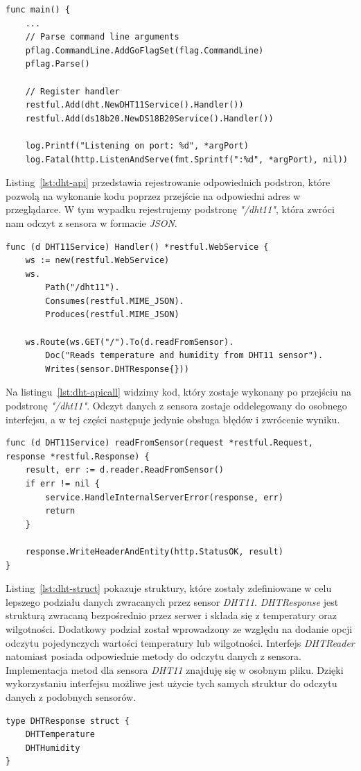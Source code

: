 \documentclass[12pt]{report}
\begin{document}
{\begin{lstlisting}[language=golang,caption=Konfiguracja aplikacji,label=lst:dht-config]
func main() {
	...
	// Parse command line arguments
	pflag.CommandLine.AddGoFlagSet(flag.CommandLine)
	pflag.Parse()

	// Register handler
	restful.Add(dht.NewDHT11Service().Handler())
	restful.Add(ds18b20.NewDS18B20Service().Handler())

	log.Printf("Listening on port: %d", *argPort)
	log.Fatal(http.ListenAndServe(fmt.Sprintf(":%d", *argPort), nil))
\end{lstlisting}

\noindent Listing~\ref{lst:dht-api} przedstawia rejestrowanie odpowiednich podstron, które pozwolą na wykonanie kodu poprzez przejście na odpowiedni adres w przeglądarce. W tym wypadku rejestrujemy podstronę \textit{"/dht11"}, która zwróci nam odczyt z sensora w formacie \textit{JSON}.
\begin{lstlisting}[language=golang,caption=Konfiguracja API,label=lst:dht-api]
func (d DHT11Service) Handler() *restful.WebService {
	ws := new(restful.WebService)
	ws.
		Path("/dht11").
		Consumes(restful.MIME_JSON).
		Produces(restful.MIME_JSON)

	ws.Route(ws.GET("/").To(d.readFromSensor).
		Doc("Reads temperature and humidity from DHT11 sensor").
		Writes(sensor.DHTResponse{}))
\end{lstlisting}

\noindent Na listingu~\ref{lst:dht-apicall} widzimy kod, który zostaje wykonany po przejściu na podstronę \textit{"/dht11"}. Odczyt danych z sensora zostaje oddelegowany do osobnego interfejsu, a w tej części następuje jedynie obsługa błędów i zwrócenie wyniku.
\begin{lstlisting}[language=golang,caption=Wywołanie kodu API,label=lst:dht-apicall]
func (d DHT11Service) readFromSensor(request *restful.Request, response *restful.Response) {
	result, err := d.reader.ReadFromSensor()
	if err != nil {
		service.HandleInternalServerError(response, err)
		return
	}

	response.WriteHeaderAndEntity(http.StatusOK, result)
}
\end{lstlisting}

\noindent Listing~\ref{lst:dht-struct} pokazuje struktury, które zostały zdefiniowane w celu lepszego podziału danych zwracanych przez sensor \textit{DHT11}. \textit{DHTResponse} jest strukturą zwracaną bezpośrednio przez serwer i składa się z temperatury oraz wilgotności. Dodatkowy podział został wprowadzony ze względu na dodanie opcji odczytu pojedynczych wartości temperatury lub wilgotności. Interfejs \textit{DHTReader} natomiast posiada odpowiednie metody do odczytu danych z sensora. Implementacja metod dla sensora \textit{DHT11} znajduję się w osobnym pliku. Dzięki wykorzystaniu interfejsu możliwe jest użycie tych samych struktur do odczytu danych z podobnych sensorów.
\begin{lstlisting}[language=golang,caption=Struktury odpowiedzi serwera,label=lst:dht-struct]
type DHTResponse struct {
	DHTTemperature
	DHTHumidity
}


\end{lstlisting}}
\end{document}
